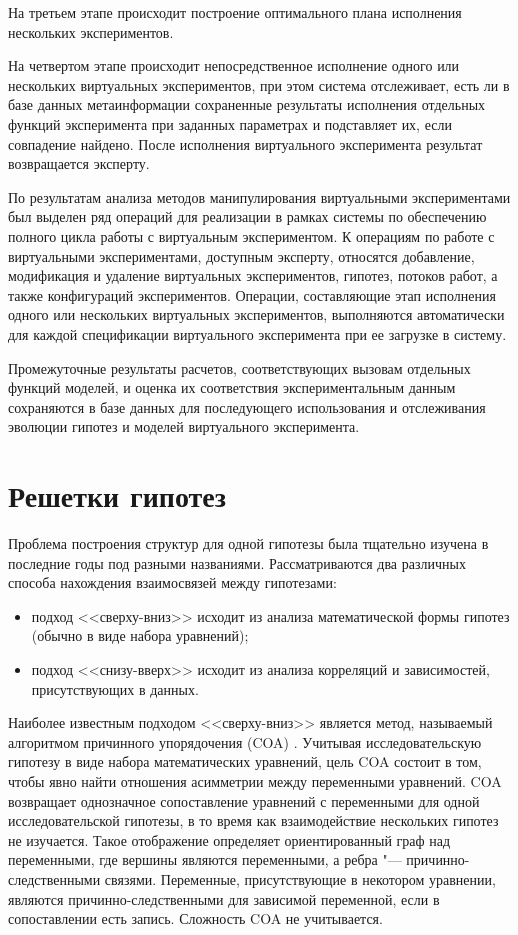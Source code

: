 На третьем этапе происходит построение оптимального плана исполнения нескольких экспериментов. 

На четвертом этапе происходит непосредственное исполнение одного или нескольких виртуальных экспериментов, при этом 
система отслеживает, есть ли в базе данных метаинформации сохраненные результаты исполнения отдельных функций 
эксперимента при заданных параметрах и подставляет их, если совпадение найдено. После исполнения виртуального 
эксперимента результат возвращается эксперту.

По результатам анализа методов манипулирования виртуальными экспериментами был выделен ряд операций для реализации 
в рамках системы по обеспечению полного цикла работы с виртуальным экспериментом. К операциям по работе с виртуальными 
экспериментами, доступным эксперту, относятся добавление, модификация и удаление виртуальных экспериментов, гипотез, 
потоков работ, а также конфигураций экспериментов. Операции, составляющие этап исполнения одного или нескольких 
виртуальных экспериментов, выполняются автоматически для каждой спецификации виртуального эксперимента при ее 
загрузке в систему. 

Промежуточные результаты расчетов, соответствующих вызовам отдельных функций моделей, и оценка их соответствия 
экспериментальным данным сохраняются в базе данных для последующего использования и отслеживания эволюции гипотез и 
моделей виртуального эксперимента.

\section{Решетки гипотез} \label{sect2_3}

Проблема построения структур для одной гипотезы была тщательно изучена в последние годы под разными названиями. 
\noindent Рассматриваются два различных способа нахождения взаимосвязей между гипотезами:
\begin{itemize}
    \item подход <<сверху-вниз>> исходит из анализа математической формы гипотез (обычно в виде набора уравнений);
    \item подход <<снизу-вверх>> исходит из анализа корреляций и зависимостей, присутствующих в данных.
\end{itemize}

Наиболее известным подходом <<сверху-вниз>> является метод, называемый алгоритмом причинного упорядочения 
(COA) \cite{simon1977causal}. Учитывая исследовательскую гипотезу в виде набора математических уравнений, цель 
COA состоит в том, чтобы явно найти отношения асимметрии между переменными уравнений. COA возвращает однозначное 
сопоставление уравнений с переменными для одной исследовательской гипотезы, в то время как взаимодействие нескольких 
гипотез не изучается. Такое отображение определяет ориентированный граф над переменными, где вершины являются 
переменными, а ребра "--- причинно-следственными связями. Переменные, присутствующие в некотором уравнении, 
являются причинно-следственными для зависимой переменной, если в сопоставлении есть запись. 
Сложность COA не учитывается.

